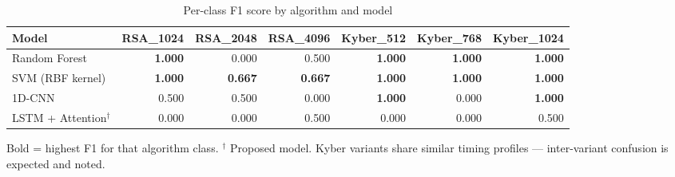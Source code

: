 \begin{table}[htbp]
  \centering
  \caption{Per-class F1 score by algorithm and model}
  \label{tab:per_class_f1}
  \renewcommand{\arraystretch}{1.15}
  \begin{tabular}{lrrrrrr}
    \toprule
    \textbf{Model} & \textbf{RSA_1024} & \textbf{RSA_2048} & \textbf{RSA_4096} & \textbf{Kyber_512} & \textbf{Kyber_768} & \textbf{Kyber_1024} \\
    \midrule
    Random Forest & \textbf{1.000} & 0.000 & 0.500 & \textbf{1.000} & \textbf{1.000} & \textbf{1.000} \\
    SVM (RBF kernel) & \textbf{1.000} & \textbf{0.667} & \textbf{0.667} & \textbf{1.000} & \textbf{1.000} & \textbf{1.000} \\
    \midrule
    1D-CNN & 0.500 & 0.500 & 0.000 & \textbf{1.000} & 0.000 & \textbf{1.000} \\
    LSTM + Attention$^\dagger$ & 0.000 & 0.000 & 0.500 & 0.000 & 0.000 & 0.500 \\
    \bottomrule
  \end{tabular}
  \begin{tablenotes}
    \small \item Bold = highest F1 for that algorithm class. $^\dagger$ Proposed model. Kyber variants share similar timing profiles — inter-variant confusion is expected and noted.
  \end{tablenotes}
\end{table}
